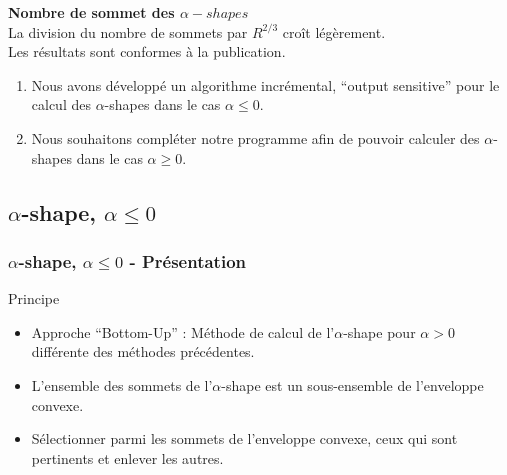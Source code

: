 \begin{frame}
\begin{columns}[t]
\begin{column}{0.9\linewidth}
  \end{column}
\end{columns}

{
  \begin{exampleblock}{}
    \textbf{Nombre de sommet des $\alpha-shapes$}\\
    La division du nombre de sommets par $R^{2/3}$ croît légèrement.\\
    Les résultats sont conformes à la publication.\\
  \end{exampleblock} 
} 
{
  \begin{alertblock}{}
    \begin{enumerate}
      \item Nous avons développé un algorithme incrémental, ``output sensitive'' pour le calcul des $\alpha$-shapes dans le cas $\alpha \leq 0$. 
      \item Nous souhaitons compléter notre programme afin de pouvoir calculer des $\alpha$-shapes dans le cas $\alpha \geq 0$.
    \end{enumerate}
  \end{alertblock} 
} 
 
\end{frame}

\subsection{$\alpha$-shape, $\alpha \leq 0$}

\begin{frame}
\frametitle{$\alpha$-shape, $\alpha \leq 0$ - Présentation}
  \begin{block}{Principe}
    \begin{itemize}
      \item Approche ``Bottom-Up'' : Méthode de calcul de l'$\alpha$-shape pour $\alpha > 0$ différente des méthodes précédentes.
      \item L'ensemble des sommets de l'$\alpha$-shape est un sous-ensemble de l'enveloppe convexe.
      \item Sélectionner parmi les sommets de l'enveloppe convexe, ceux qui sont pertinents et enlever les autres.
    \end{itemize}  
  \end{block}
\end{frame}

